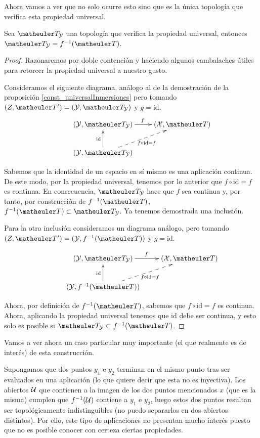 Ahora vamos a ver que no solo ocurre esto sino que es la única topología que verifica esta propiedad universal.

\begin{prop}
	Sea $\T_\Y$ una topología que verifica la propiedad universal, entonces $\T_\Y=f^{-1}(\T)$.
\end{prop}
\begin{proof}
	Razonaremos por doble contención y haciendo algunos cambalaches útiles para retorcer la propiedad universal a nuestro gusto.
	
	Consideramos el siguiente diagrama, análogo al de la demostración de la proposición \ref{const_universalInmersiones} pero tomando $(Z,\T')=(\Y,\T_\Y)$ y $g=\text{id}$.
	\begin{equation*}
	\xymatrix{
		&(\mathcal{Y},\T_{\mathcal{Y}}) \ar[r]^f
		&(\mathcal{X},\T) \\
		&(\mathcal{Y},\T_{\mathcal{Y}}) \ar@{-->}[ru]_{f\circ \text{id}=f} \ar[u]^{\text{id}}}
	\end{equation*}
	
	Sabemos que la identidad de un espacio en sí mismo es una aplicación continua. De este modo, por la propiedad universal, tenemos por lo anterior que $f\circ\text{id}=f$ es continua. En consecuencia, $\T_{\mathcal{Y}}$ hace que $f$ sea continua y, por tanto, por construcción de $f^{-1}(\T)$, $f^{-1}(\T)\subset \T_\Y$. Ya tenemos demostrada una inclusión.
	
	Para la otra inclusión consideramos un diagrama análogo, pero tomando $(Z,\T')=(\Y,f^{-1}(\T))$ y $g=\text{id}$.  
	
	\begin{equation*}
	\xymatrix{
		&(\mathcal{Y},\T_{\mathcal{Y}}) \ar[r]^f
		&(\mathcal{X},\T) \\
		&(\mathcal{Y},f^{-1}(\T)) \ar@{-->}[ru]_{f\circ \text{id}=f} \ar[u]^{\text{id}}}
	\end{equation*}
	
	Ahora, por definición de $f^{-1}(\T)$, sabemos que $f\circ\text{id}=f$ es continua. Ahora, aplicando la propiedad universal tenemos que $\text{id}$ debe ser continua, y esto solo es posible si $\T_\Y\subset f^{-1}(\T)$.
\end{proof}
\begin{obs}[Inyectividad] Vamos a ver ahora un caso particular muy importante (el que realmente es de interés) de esta construcción.

Supongamos que dos puntos $y_1$ e $y_2$ terminan en el mismo punto tras ser evaluados en una aplicación (lo que quiere decir que esta no es inyectiva). Los abiertos $\mathcal{U}$ que contienen a la imagen de los dos puntos mencionados $x$ (que es la misma) cumplen que $f^{-1}(\mathcal{U})$ contiene a $y_1$ e $y_2$, luego estos dos puntos resultan ser topológicamente indistinguibles (no puedo separarlos en dos abiertos distintos). Por ello, este tipo de aplicaciones no presentan mucho interés puesto que no es posible conocer con certeza ciertas propiedades.
\end{obs}
